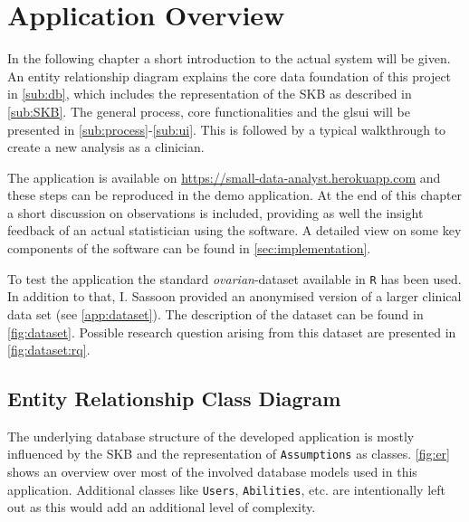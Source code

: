 \section{Application Overview}
In the following chapter a short introduction to the actual system will be given. An entity relationship diagram explains the core data foundation of this project in \autoref{sub:db}, which includes the representation of the \gls{SKB} as described in \autoref{sub:SKB}. The general process, core functionalities and the gls{ui} will be presented in \autoref{sub:process}-\ref{sub:ui}. This is followed by a typical walkthrough to create a new analysis as a clinician. 

The application is available on \href{https://small-data-analyst.herokuapp.com}{https://small-data-analyst.herokuapp.com} and these steps can be reproduced in the demo application. At the end of this chapter a short discussion on observations is included, providing as well the insight feedback of an actual statistician using the software. A detailed view on some key components of the software can be found in \autoref{sec:implementation}.


To test the application the standard \textit{ovarian}-dataset available in \texttt{R} has been used. In addition to that, I. Sassoon provided an anonymised version of a larger clinical data set (see \autoref{app:dataset}). The description of the dataset can be found in \autoref{fig:dataset}. Possible research question arising from this dataset are presented in \autoref{fig:dataset:rq}.



\subsection{Entity Relationship Class Diagram }
\label{sub:db}


The underlying database structure of the developed application is mostly influenced by the \gls{SKB} and the representation of \texttt{Assumptions} as classes. \autoref{fig:er} shows an overview over most of the involved database models used in this application. Additional classes like \texttt{Users}, \texttt{Abilities}, etc. are intentionally left out as this would add an additional level of complexity. 

